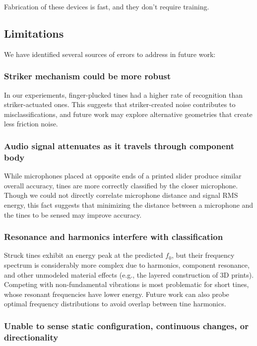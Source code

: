     Fabrication of these devices is fast, and they don't require training.
    
    \subsection{Limitations}
    
     We have identified several sources of errors to address in future work:

    \subsubsection{Striker mechanism could be more robust}
    In our experiements, finger-plucked tines had a higher rate of recognition than striker-actuated ones. This suggests that striker-created noise contributes to misclassifications, and future work may explore alternative geometries that create less friction noise.

    \subsubsection{Audio signal attenuates as it travels through component body}
    While microphones placed at opposite ends of a printed slider produce similar overall accuracy, tines are more correctly classified by the closer microphone. Though we could not directly correlate microphone distance and signal RMS energy, this fact suggests that minimizing the distance between a microphone and the tines to be sensed may improve accuracy.

    \subsubsection{Resonance and harmonics interfere with classification}
    Struck tines exhibit an energy peak at the predicted $f_0$, but their frequency spectrum is considerably more complex due to harmonics, component resonance, and other unmodeled material effects (e.g., the layered construction of 3D prints). Competing with non-fundamental vibrations is most problematic for short tines, whose resonant frequencies have lower energy. Future work can also probe optimal frequency distributions to avoid overlap between tine harmonics.

    \subsubsection{Unable to sense static configuration, continuous changes, or directionality}

